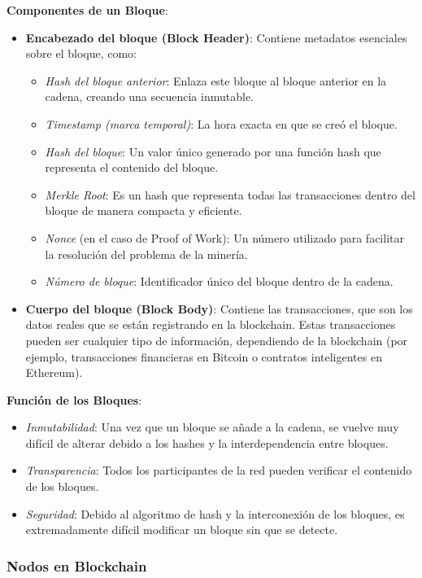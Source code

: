\textbf{Componentes de un Bloque}:
\begin{itemize}
    \item \textbf{Encabezado del bloque (Block Header)}: Contiene metadatos esenciales sobre el bloque, como:
    \begin{itemize}
        \item \textit{Hash del bloque anterior}: Enlaza este bloque al bloque anterior en la cadena, creando una secuencia inmutable.
        \item \textit{Timestamp (marca temporal)}: La hora exacta en que se creó el bloque.
        \item \textit{Hash del bloque}: Un valor único generado por una función hash que representa el contenido del bloque.
        \item \textit{Merkle Root}: Es un hash que representa todas las transacciones dentro del bloque de manera compacta y eficiente.
        \item \textit{Nonce} (en el caso de Proof of Work): Un número utilizado para facilitar la resolución del problema de la minería.
        \item \textit{Número de bloque}: Identificador único del bloque dentro de la cadena.
    \end{itemize}
    \item \textbf{Cuerpo del bloque (Block Body)}: Contiene las transacciones, que son los datos reales que se están registrando en la blockchain. Estas transacciones pueden ser cualquier tipo de información, dependiendo de la blockchain (por ejemplo, transacciones financieras en Bitcoin o contratos inteligentes en Ethereum).
\end{itemize}

\textbf{Función de los Bloques}:
\begin{itemize}
    \item \textit{Inmutabilidad}: Una vez que un bloque se añade a la cadena, se vuelve muy difícil de alterar debido a los hashes y la interdependencia entre bloques.
    \item \textit{Transparencia}: Todos los participantes de la red pueden verificar el contenido de los bloques.
    \item \textit{Seguridad}: Debido al algoritmo de hash y la interconexión de los bloques, es extremadamente difícil modificar un bloque sin que se detecte.
\end{itemize}

\subsubsection{Nodos en Blockchain}

